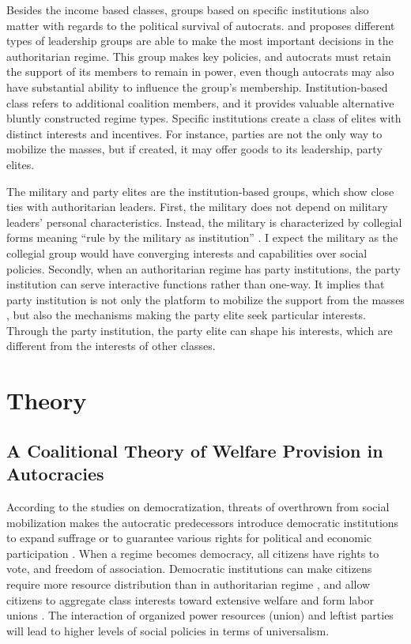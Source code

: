 \documentclass[12pt, letterpage, notitlepage]{article}
\begin{document}
Besides the income based classes, groups based on specific institutions also matter with regards to the political survival of autocrats. \citet{Geddes1999} and \citet{Geddes2014} proposes different types of leadership groups are able to make the most important decisions in the authoritarian regime. This group makes key policies, and autocrats must retain the support of its members to remain in power, even though autocrats may also have substantial ability to influence the group's membership. Institution-based class refers to additional coalition members, and it provides valuable alternative bluntly constructed regime types. Specific institutions create a class of elites with distinct interests and incentives. For instance, parties are not the only way to mobilize the masses, but if created, it may offer goods to its leadership, party elites. 

The military and party elites are the institution-based groups, which show close ties with authoritarian leaders. First, the military does not depend on military leaders’ personal characteristics. Instead, the military is characterized by collegial forms meaning ``rule by the military as institution'' \citep{Geddes2014b, Kim2017}. I expect the military as the collegial group would have converging interests and capabilities over social policies. Secondly, when an authoritarian regime has party institutions, the party institution can serve interactive functions rather than one-way. It implies that party institution is not only the platform to mobilize the support from the masses \citep{Gandhi2006}, but also the mechanisms making the party elite seek particular interests. Through the party institution, the party elite can shape his interests, which are different from the interests of other classes.

\section{Theory}
\subsection{A Coalitional Theory of Welfare Provision in Autocracies}

According to the studies on democratization, threats of overthrown from social mobilization makes the autocratic predecessors introduce democratic institutions to expand suffrage or to guarantee various rights for political and economic participation \citep{Acemoglu2005,Acemoglu2006a}. When a regime becomes democracy, all citizens have rights to vote, and freedom of association. Democratic institutions can make citizens require more resource distribution than in authoritarian regime \citep{Meltzer1981}, and allow citizens to aggregate class interests toward extensive welfare and form labor unions \citep{Korpi2006}. The interaction of organized power resources (union) and leftist parties will lead to higher levels of social policies in terms of universalism. 
\end{document}
